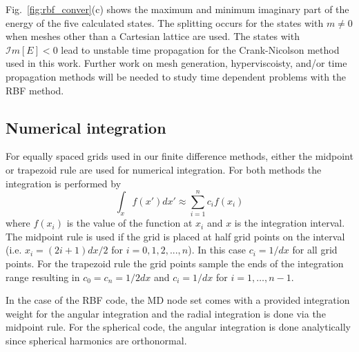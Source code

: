 Fig.~\ref{fig:rbf_conver}(c) shows the maximum and minimum imaginary part of the energy of the five calculated states. The splitting occurs for the states with $m\ne0$ when meshes other than a Cartesian  lattice are used. The states with $\mathcal{I}m[E]<0$ lead to unstable time propagation for the Crank-Nicolson method used in this work. Further work on mesh generation, hyperviscoisty, and/or time propagation methods will be needed to study time dependent problems with the RBF method.



\subsection{Numerical integration} %
\label{sub:numerical_integration}
For equally spaced grids used in our finite difference methods, either the midpoint or trapezoid rule are used for numerical integration. For both methods the integration is performed by 
\begin{equation}
    \int_{x} f(x')dx' \approx \sum_{i=1}^n c_i f(x_i)
\end{equation}
where $f(x_i)$ is the value of the function at $x_i$ and $x$ is the integration interval. The midpoint rule is used if the grid is placed at half grid points on the interval (i.e. $x_i = (2i+1)dx/2$ for $i=0,1,2,...,n$). In this case $c_i = 1/dx$ for all grid points. For the trapezoid rule the grid points sample the ends of the integration range resulting in $c_0 = c_n = 1/2dx$ and $c_i = 1/dx$ for $i=1, \ldots, n-1$. 

In the case of the RBF code, the MD node set comes with a provided integration weight for the angular integration and the radial integration is done via the midpoint rule. 
For the spherical code, the angular integration is done analytically since spherical harmonics are orthonormal.

